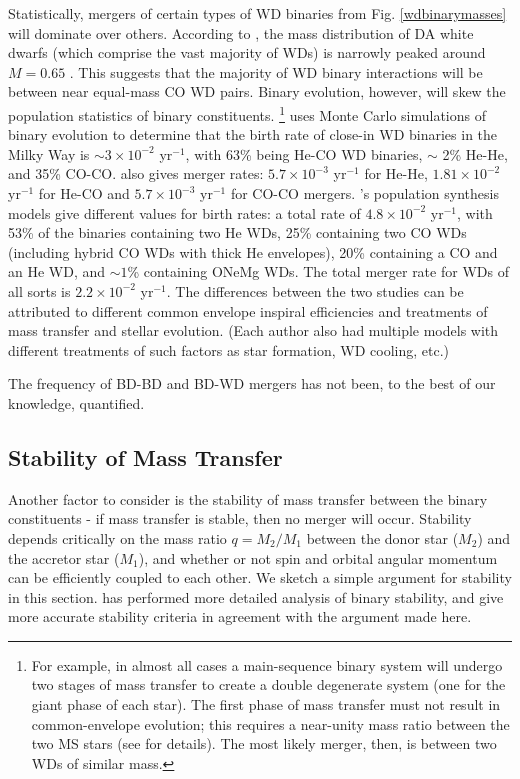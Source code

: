 Statistically, mergers of certain types of WD binaries from Fig. \ref{wdbinarymasses} will dominate over others.  According to \cite{tremblay}, the mass distribution of DA white dwarfs (which comprise the vast majority of WDs) is narrowly peaked around $M = 0.65$ \Msun.  This suggests that the majority of WD binary interactions will be between near equal-mass CO WD pairs.  Binary evolution, however, will skew the population statistics of binary constituents.  \footnote{For example, in almost all cases a main-sequence binary system will undergo two stages of mass transfer to create a double degenerate system (one for the giant phase of each star).  The first phase of mass transfer must not result in common-envelope evolution; this requires a near-unity mass ratio between the two MS stars (see \cite{vkercj10} for details).  The most likely merger, then, is between two WDs of similar mass.}  \cite{han98} uses Monte Carlo simulations of binary evolution to determine that the birth rate of close-in WD binaries in the Milky Way is $\sim 3 \times 10^{-2}$ yr$^{-1}$, with 63\% being He-CO WD binaries, $\sim$ 2\% He-He, and 35\% CO-CO.  \citeauthor{han98} also gives merger rates: $5.7 \times 10^{-3}$ yr$^{-1}$ for He-He, $1.81 \times 10^{-2}$ yr$^{-1}$ for He-CO and $5.7 \times 10^{-3}$ yr$^{-1}$ for CO-CO mergers.  \cite{nele+01a}'s population synthesis models give different values for birth rates: a total rate of $4.8 \times 10^{-2}$ yr$^{-1}$, with 53\% of the binaries containing two He WDs, 25\% containing two CO WDs (including hybrid CO WDs with thick He envelopes), 20\% containing a CO and an He WD, and $\sim 1$\% containing ONeMg WDs.  The total merger rate for WDs of all sorts is $2.2 \times 10^{-2}$ yr$^{-1}$.  The differences between the two studies can be attributed to different common envelope inspiral efficiencies and treatments of mass transfer and stellar evolution.  (Each author also had multiple models with different treatments of such factors as star formation, WD cooling, etc.)

The frequency of BD-BD and BD-WD mergers has not been, to the best of our knowledge, quantified.

\subsection{Stability of Mass Transfer}
\label{ssec:stabilityofmasstransfer}

Another factor to consider is the stability of mass transfer between the binary constituents - if mass transfer is stable, then no merger will occur.  Stability depends critically on the mass ratio $q = M_2/M_1$ between the donor star ($M_2$) and the accretor star ($M_1$), and whether or not spin and orbital angular momentum can be efficiently coupled to each other.  We sketch a simple argument for stability in this section.  \cite{marsns04} has performed more detailed analysis of binary stability, and give more accurate stability criteria in agreement with the argument made here.


